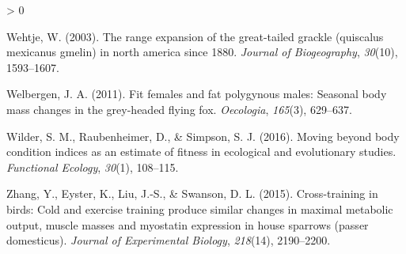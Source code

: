 \documentclass[
]{article}
\newlength{\cslhangindent}
\newenvironment{CSLReferences}[2] %
 {%
  \setlength{\parindent}{0pt}
  \ifodd #1 \everypar{\setlength{\hangindent}{\cslhangindent}}\ignorespaces\fi
  \ifnum #2 > 0
  \setlength{\parskip}{#2\baselineskip}
  \fi
 }%
 {}
\begin{document}
\begin{CSLReferences}{1}{0}
\leavevmode\hypertarget{ref-wehtje2003range}{}%
Wehtje, W. (2003). The range expansion of the great-tailed grackle
(quiscalus mexicanus gmelin) in north america since 1880. \emph{Journal
of Biogeography}, \emph{30}(10), 1593--1607.

\leavevmode\hypertarget{ref-welbergen2011fit}{}%
Welbergen, J. A. (2011). Fit females and fat polygynous males: Seasonal
body mass changes in the grey-headed flying fox. \emph{Oecologia},
\emph{165}(3), 629--637.

\leavevmode\hypertarget{ref-wilder2016moving}{}%
Wilder, S. M., Raubenheimer, D., \& Simpson, S. J. (2016). Moving beyond
body condition indices as an estimate of fitness in ecological and
evolutionary studies. \emph{Functional Ecology}, \emph{30}(1), 108--115.

\leavevmode\hypertarget{ref-zhang2015cross}{}%
Zhang, Y., Eyster, K., Liu, J.-S., \& Swanson, D. L. (2015).
Cross-training in birds: Cold and exercise training produce similar
changes in maximal metabolic output, muscle masses and myostatin
expression in house sparrows (passer domesticus). \emph{Journal of
Experimental Biology}, \emph{218}(14), 2190--2200.

\end{CSLReferences}
\end{document}
